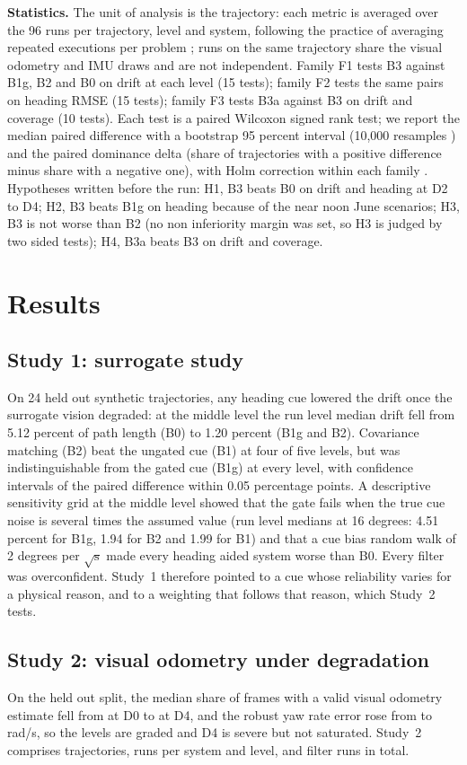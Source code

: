 \documentclass[conference]{IEEEtran}
\begin{document}
\textbf{Statistics.} The unit of analysis is the trajectory: each metric is averaged over the 96 runs per trajectory, level and system, following the practice of averaging repeated executions per problem \cite{derrac}; runs on the same trajectory share the visual odometry and IMU draws and are not independent. Family F1 tests B3 against B1g, B2 and B0 on drift at each level (15 tests); family F2 tests the same pairs on heading RMSE (15 tests); family F3 tests B3a against B3 on drift and coverage (10 tests). Each test is a paired Wilcoxon signed rank test; we report the median paired difference with a bootstrap 95 percent interval (10,000 resamples \cite{colas}) and the paired dominance delta (share of trajectories with a positive difference minus share with a negative one), with Holm correction within each family \cite{derrac}. Hypotheses written before the run: H1, B3 beats B0 on drift and heading at D2 to D4; H2, B3 beats B1g on heading because of the near noon June scenarios; H3, B3 is not worse than B2 (no non inferiority margin was set, so H3 is judged by two sided tests); H4, B3a beats B3 on drift and coverage.

\section{Results}
\label{sec:results}
\subsection{Study 1: surrogate study}
On 24 held out synthetic trajectories, any heading cue lowered the drift once the surrogate vision degraded: at the middle level the run level median drift fell from 5.12 percent of path length (B0) to 1.20 percent (B1g and B2). Covariance matching (B2) beat the ungated cue (B1) at four of five levels, but was indistinguishable from the gated cue (B1g) at every level, with confidence intervals of the paired difference within 0.05 percentage points. A descriptive sensitivity grid at the middle level showed that the gate fails when the true cue noise is several times the assumed value (run level medians at 16 degrees: 4.51 percent for B1g, 1.94 for B2 and 1.99 for B1) and that a cue bias random walk of 2 degrees per $\sqrt{\mathrm{s}}$ made every heading aided system worse than B0. Every filter was overconfident. Study~1 therefore pointed to a cue whose reliability varies for a physical reason, and to a weighting that follows that reason, which Study~2 tests.

\subsection{Study 2: visual odometry under degradation}
On the held out split, the median share of frames with a valid visual odometry estimate fell from \nvoOkDzero{} at D0 to \nvoOkDfour{} at D4, and the robust yaw rate error rose from \nvoSigWDzero{} to \nvoSigWDfour{} rad/s, so the levels are graded and D4 is severe but not saturated. Study~2 comprises \nnTraj{} trajectories, \nnRunsCell{} runs per system and level, and \nnRuns{} filter runs in total.
\end{document}
